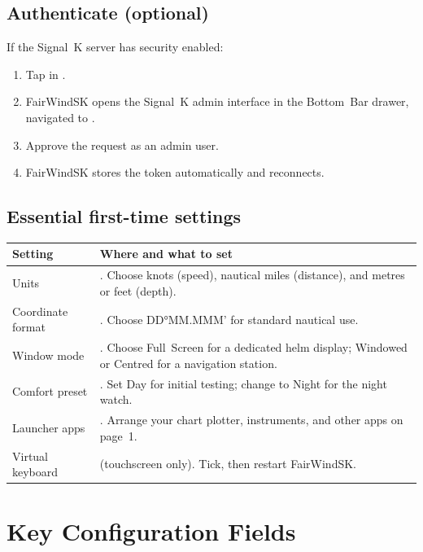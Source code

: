 \subsection{Authenticate (optional)}

If the Signal~K server has security enabled:

\begin{enumerate}
  \item Tap  in .
  \item FairWindSK opens the Signal~K admin interface in the
        Bottom~Bar drawer, navigated to
        .
  \item Approve the request as an admin user.
  \item FairWindSK stores the token automatically and reconnects.
\end{enumerate}

\subsection{Essential first-time settings}

\begin{longtable}{L{4.0cm}L{9.7cm}}
\toprule
{}
\color{white}\sffamily\bfseries Setting &
\color{white}\sffamily\bfseries Where and what to set \\
\midrule
Units &
  .
  Choose knots (speed), nautical miles (distance), and metres or feet (depth). \\
Coordinate format &
  .
  Choose DD°MM.MMM' for standard nautical use. \\
Window mode &
  .
  Choose Full~Screen for a dedicated helm display;
  Windowed or Centred for a navigation station. \\
Comfort preset &
  .
  Set Day for initial testing; change to Night for the night watch. \\
Launcher apps &
  .
  Arrange your chart plotter, instruments, and other apps on page~1. \\
Virtual keyboard &
   (touchscreen only).
  Tick, then restart FairWindSK. \\
\bottomrule
\end{longtable}

\section{Key Configuration Fields}
\label{app:config}

